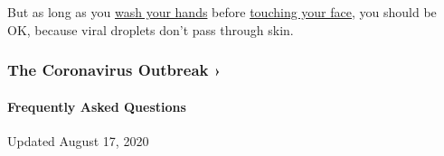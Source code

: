 But as long as you
\href{https://www.nytimes3xbfgragh.onion/2016/04/21/health/washing-hands.html}{wash
your hands} before
\href{https://www.nytimes3xbfgragh.onion/2020/03/02/well/live/coronavirus-spread-transmission-face-touching-hands.html}{touching
your face,} you should be OK, because viral droplets don't pass through
skin.

\href{https://www.nytimes3xbfgragh.onion/news-event/coronavirus?action=click\&pgtype=Article\&state=default\&region=MAIN_CONTENT_3\&context=storylines_faq}{}

\hypertarget{the-coronavirus-outbreak-}{%
\subsubsection{The Coronavirus Outbreak
›}\label{the-coronavirus-outbreak-}}

\hypertarget{frequently-asked-questions}{%
\paragraph{Frequently Asked
Questions}\label{frequently-asked-questions}}

Updated August 17, 2020

